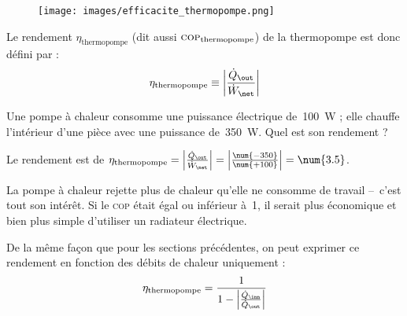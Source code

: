 		\begin{figure}
			\begin{center}
				\vspace{-0.5cm}
				\texttt{[image: images/efficacite\_thermopompe.png]}
				\vspace{-1cm}
			\end{center}
			\label{fig_transferts_thermopompe}
		\end{figure}

		Le rendement $\eta_\text{thermopompe}$ (dit aussi $\textsc{cop}_\text{thermopompe}$) de la thermopompe est donc défini par :
		\begin{equation}
			\eta_\text{thermopompe} \equiv \left| \frac{\dot Q_\out}{\dot W_\net} \right|
			\label{def_rendement_thermopompe}
		\end{equation}
	
			\begin{anexample}
				Une pompe à chaleur consomme une puissance électrique de~\SI{100}{\watt} ; elle chauffe l’intérieur d’une pièce avec une puissance de~\SI{350}{\watt}. Quel est son rendement ?
		
				\begin{answer}
					Le rendement est de $\eta_\text{thermopompe} = \left| \frac{\dot Q_\out}{\dot W_\net} \right| = \left| \frac{\num{-350}}{\num{+100}} \right| = \num{3.5}$.
						\begin{remark} La pompe à chaleur rejette plus de chaleur qu’elle ne consomme de travail –\ c’est tout son intérêt. Si le \textsc{cop} était égal ou inférieur à~\num{1}, il serait plus économique et bien plus simple d’utiliser un radiateur électrique.\end{remark}
				\end{answer}
			\end{anexample}


		De la même façon que pour les sections précédentes, on peut exprimer ce rendement en fonction des débits de chaleur uniquement :
		\begin{equation}
			\eta_\text{thermopompe} = \frac{1}{1 - \left| \frac{\dot Q_\inn}{\dot Q_\out} \right|}
			\label{eq_rendement_thermopompe_qin_qout}
		\end{equation}



	\onlyframabook{\clearpage}
